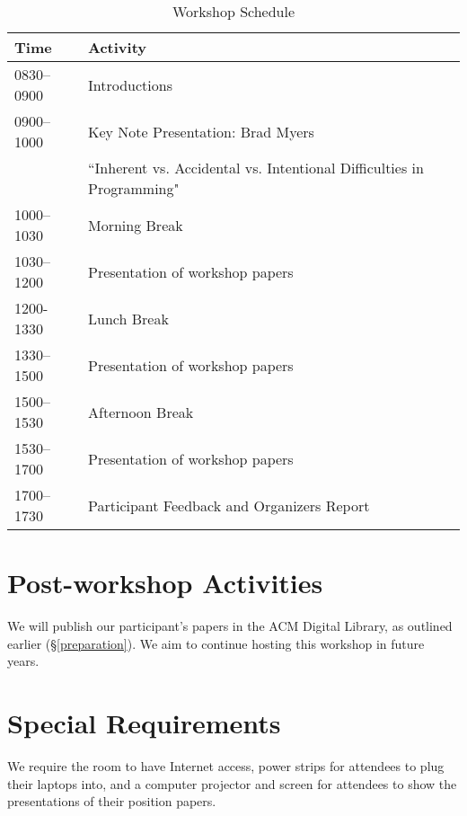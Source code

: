 \documentclass{sigplanconf}
\begin{document}
\begin{table} [!htbp] %
\begin{tabularx}{\columnwidth}{l|X}
\textbf{Time}   & \textbf{Activity} \\
\hline
0830--0900    & Introductions \vspace{1mm} \\
0900--1000    & Key Note Presentation: Brad Myers \vspace{1mm} \\
                       &``Inherent vs. Accidental vs. Intentional Difficulties in Programming"\\
1000--1030     & Morning Break~\vspace{1mm}\\
1030--1200   & Presentation of workshop papers \vspace{1mm}\\
1200-1330     & Lunch Break~\vspace{1mm}\\
1330--1500   & Presentation of workshop papers \vspace{1mm}\\
1500--1530    & Afternoon Break~\vspace{1mm}\\
1530--1700    & Presentation of workshop papers \vspace{1mm}\\
1700--1730    & Participant Feedback and Organizers Report  \\
\end{tabularx}
\caption{Workshop Schedule}
\label{tab:schedule}
\end{table}

\section{Post-workshop Activities}

We will publish our participant's papers in the ACM Digital Library, as outlined earlier (\S \ref{preparation}). We aim to continue hosting this workshop in future years.

\section{Special Requirements}

We require the room to have Internet access, power strips for
attendees to plug their laptops into, and a computer projector and
screen for attendees to show the presentations of their position
papers.
\end{document}
